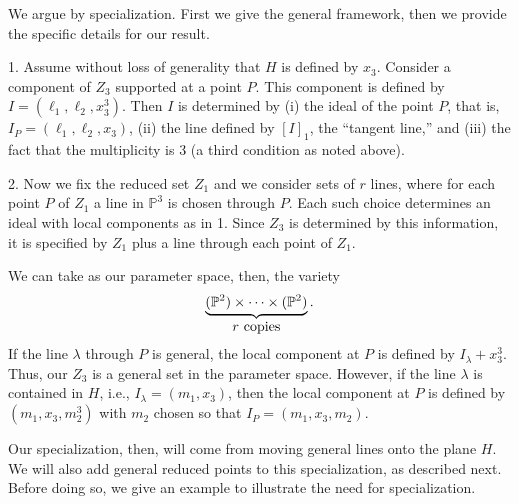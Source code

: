\documentclass[12pt]{amsart}%
\numberwithin{equation}{section}
\theoremstyle{definition}
\numberwithin{equation}{section}
\begin{document}
We argue by specialization. First we give the general framework, then we provide the specific details for our result.

1. Assume without loss of generality that $H$ is defined by $x_3$. Consider a component of $Z_3$ supported at a point $P$. This  component is defined by $I = (\ell_1, \ell_2, x_3^3)$. Then $I$ is determined by (i) the ideal of the point $P$, that is, $I_P = (\ell_1, \ell_2, x_3)$,  (ii) the line defined by $[I]_1$, the “tangent line,” and (iii) the fact that the multiplicity is 3 (a third condition as noted above).

2. Now we fix the reduced set $Z_1$ and we consider sets of $r$ lines, where for each point $P$ of $Z_1$ a line in $\mathbb P^3$ is chosen through $P$. Each such choice determines an ideal with local components as in 1. 
 Since $Z_3$ is determined by this information, it is specified by $Z_1$ plus a line through each point of $Z_1$.

We can take as our parameter space, then, the variety
\[
\underbrace{(\mathbb P^2) \times \dots \times  (\mathbb P^2)}_{ \hbox{$r$ copies}}.
\]
If the line $\lambda$ through $P$ is general, the local component at $P$ is defined by $I_\lambda + x_3^3$.
Thus, our $Z_3$ is a general set in the parameter space. 
However, if the line $\lambda$ is contained in $H$, i.e., $I_\lambda = (m_1, x_3)$, then the local component at $P$ is defined by 
$(m_1, x_3, m_2^3)$ with $m_2$ chosen so that $I_P = (m_1, x_3, m_2)$. 

Our specialization, then, will come from moving general lines onto the plane $H$. We will also add general reduced points to this specialization, as described next. Before doing so, we give an example to illustrate the need for specialization.
\end{document}
